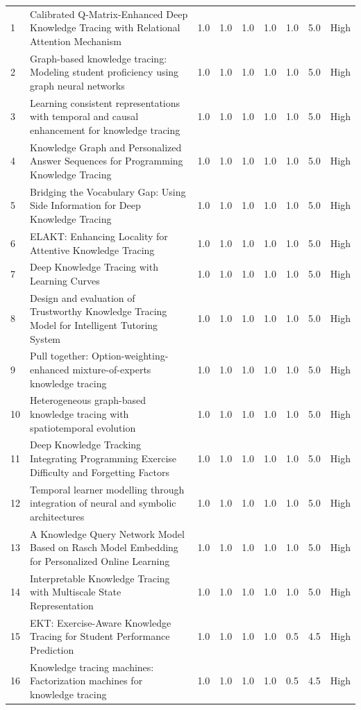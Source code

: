 \documentclass{article}
\begin{document}
\begin{longtable}{p{1cm}p{8cm}p{1cm}p{1cm}p{1cm}p{1cm}p{1cm}p{1.5cm}p{1.5cm}}
1 & Calibrated Q-Matrix-Enhanced Deep Knowledge Tracing with Relational Attention Mechanism & 1.0 & 1.0 & 1.0 & 1.0 & 1.0 & 5.0 & High \\
2 & Graph-based knowledge tracing: Modeling student proficiency using graph neural networks & 1.0 & 1.0 & 1.0 & 1.0 & 1.0 & 5.0 & High \\
3 & Learning consistent representations with temporal and causal enhancement for knowledge tracing & 1.0 & 1.0 & 1.0 & 1.0 & 1.0 & 5.0 & High \\
4 & Knowledge Graph and Personalized Answer Sequences for Programming Knowledge Tracing & 1.0 & 1.0 & 1.0 & 1.0 & 1.0 & 5.0 & High \\
5 & Bridging the Vocabulary Gap: Using Side Information for Deep Knowledge Tracing & 1.0 & 1.0 & 1.0 & 1.0 & 1.0 & 5.0 & High \\
6 & ELAKT: Enhancing Locality for Attentive Knowledge Tracing & 1.0 & 1.0 & 1.0 & 1.0 & 1.0 & 5.0 & High \\
7 & Deep Knowledge Tracing with Learning Curves & 1.0 & 1.0 & 1.0 & 1.0 & 1.0 & 5.0 & High \\
8 & Design and evaluation of Trustworthy Knowledge Tracing Model for Intelligent Tutoring System & 1.0 & 1.0 & 1.0 & 1.0 & 1.0 & 5.0 & High \\
9 & Pull together: Option-weighting-enhanced mixture-of-experts knowledge tracing & 1.0 & 1.0 & 1.0 & 1.0 & 1.0 & 5.0 & High \\
10 & Heterogeneous graph-based knowledge tracing with spatiotemporal evolution & 1.0 & 1.0 & 1.0 & 1.0 & 1.0 & 5.0 & High \\
11 & Deep Knowledge Tracking Integrating Programming Exercise Difficulty and Forgetting Factors & 1.0 & 1.0 & 1.0 & 1.0 & 1.0 & 5.0 & High \\
12 & Temporal learner modelling through integration of neural and symbolic architectures & 1.0 & 1.0 & 1.0 & 1.0 & 1.0 & 5.0 & High \\
13 & A Knowledge Query Network Model Based on Rasch Model Embedding for Personalized Online Learning & 1.0 & 1.0 & 1.0 & 1.0 & 1.0 & 5.0 & High \\
14 & Interpretable Knowledge Tracing with Multiscale State Representation & 1.0 & 1.0 & 1.0 & 1.0 & 1.0 & 5.0 & High \\
15 & EKT: Exercise-Aware Knowledge Tracing for Student Performance Prediction & 1.0 & 1.0 & 1.0 & 1.0 & 0.5 & 4.5 & High \\
16 & Knowledge tracing machines: Factorization machines for knowledge tracing & 1.0 & 1.0 & 1.0 & 1.0 & 0.5 & 4.5 & High \\

\end{longtable}
\end{document}
